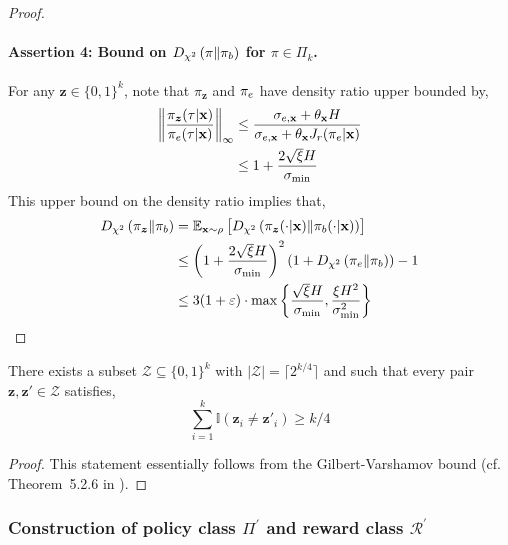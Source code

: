 \begin{proof}
\paragraph{Assertion 4: Bound on $D_{\chi^2} \left( \pi \| \pi_b \right)$ for $\pi \in \Pi_k$.} For any $\bm{z} \in \{ 0,1 \}^k$, note that $\pi_{\bm{z}}$ and $\pi_e$ have density ratio upper bounded by,
\begin{align*}
    \left\| \frac{\pi_{\bm{z}} (\tau|\mathbf{x})}{\pi_e(\tau|\mathbf{x})} \right\|_\infty &\le  \frac{\sigma_{e,\mathbf{x}} + \theta_{\mathbf{x}} H}{\sigma_{e,\mathbf{x}} + \theta_{\mathbf{x}} J_r (\pi_e|\mathbf{x})} \\
    &\le 1+\frac{2\sqrt{\xi} H}{\sigma_{\min}}
\end{align*}
This upper bound on the density ratio implies that,
\begin{align*}
    D_{\chi^2} \left( \pi_{\bm{z}} \| \pi_b \right) &= \mathbb{E}_{\mathbf{x} \sim \rho} \left[ D_{\chi^2} \left( \pi_{\bm{z}}(\cdot|\mathbf{x}) \| \pi_b (\cdot|\mathbf{x}) \right) \right] \\
    &\le \left( 1 + \frac{2\sqrt{\xi} H}{\sigma_{\min}} \right)^2  (1+D_{\chi^2} \left( \pi_e \| \pi_b \right)) - 1 \\
    &\le 3 (1+\varepsilon) \cdot \max \left\{ \frac{\sqrt{\xi} H}{\sigma_{\min}} , \frac{\xi H^2}{\sigma_{\min}^2} \right\}
\end{align*}
\end{proof}


\begin{lemma} \label{lemma:GV}
There exists a subset $\mathcal{Z} \subseteq \{ 0,1 \}^k$ with $|\mathcal{Z}| = \lceil 2^{k/4} \rceil$ and such that every pair $\bm{z}, \bm{z}' \in \mathcal{Z}$ satisfies,
\begin{equation*}
    \sum_{i=1}^k \mathbb{I} (\bm{z}_i \ne \bm{z}'_i) \ge k/4
\end{equation*} 
\end{lemma}
\begin{proof}
This statement essentially follows from the Gilbert-Varshamov bound (cf. Theorem~5.2.6 in \cite{LingXing2004}).
\end{proof}


\subsubsection{Construction of policy class \texorpdfstring{$\Pi^\prime$}{} and reward class \texorpdfstring{$\mathcal{R}^\prime$}{}} \label{subsubsec:PIR}

